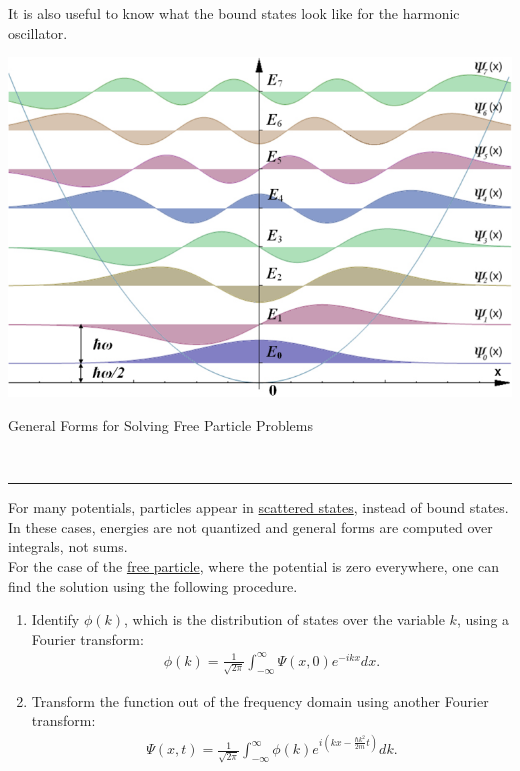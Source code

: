 \documentclass{article}
\newcommand{\header}[1]{\begin{large}\noindent #1\end{large}\\\rule{\textwidth}{0.5pt}}
\newcommand{\gap}{\medskip\\}
\begin{document}
    It is also useful to know what the bound states look like for
    the harmonic oscillator.

    \begin{center}
        \includegraphics[scale=0.3]{harmonic-oscillator-states.png}
    \end{center}

    \header{General Forms for Solving Free Particle Problems}

    For many potentials, particles appear in \underline{scattered states},
    instead of bound states. In these cases, energies are not quantized
    and general forms are computed over integrals, not sums.
    \gap
    For the case of the \underline{free particle}, where the 
    potential is zero everywhere, one can find the solution using the
    following procedure.
    \begin{enumerate}
        \item Identify $\phi(k)$, which is the distribution of states 
        over the variable $k$, using a Fourier transform:
        \begin{align*}
            \phi(k) = \frac{1}{\sqrt{2\pi}} \int_{-\infty}^{\infty}\Psi(x, 0)e^{-ikx}dx.
        \end{align*}
        \item Transform the function out of the frequency domain using 
        another Fourier transform: 
        \begin{align*}
            \Psi(x,t) = \frac{1}{\sqrt{2\pi}}\int_{-\infty}^{\infty} \phi(k) e^{i\left(kx - \frac{\hbar k^2}{2m}t\right)} dk.
        \end{align*}
    \end{enumerate}
\end{document}
